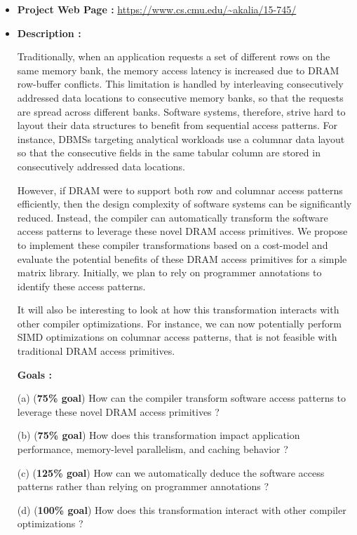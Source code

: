 \documentclass[letterpaper]{article}
\begin{document}
\begin{itemize}

\item \textbf{Project Web Page :} \url{https://www.cs.cmu.edu/~akalia/15-745/}

\item \textbf{Description :} 

Traditionally, when an application requests a set of different rows 
on the same memory bank, the memory access latency is increased due
to DRAM row-buffer conflicts.
This limitation is handled by interleaving consecutively 
addressed data locations to consecutive memory banks, so that
the requests are spread across different banks.
Software systems, therefore, strive hard to layout their data structures 
to benefit from sequential access patterns. 
For instance, DBMSs targeting analytical workloads use a columnar data 
layout so that the consecutive fields in the same tabular column are stored in
consecutively addressed data locations.

However, if DRAM were to support both row and columnar access patterns
efficiently, then the design complexity of software systems can be significantly 
reduced. Instead, the compiler can automatically transform the software access
patterns to leverage these novel DRAM access primitives. 
We propose to implement these compiler transformations based
on a cost-model and evaluate the potential benefits of these DRAM access
primitives for a simple matrix library. Initially, we plan to rely on 
programmer annotations to identify these access patterns.

It will also be interesting to look at how this transformation interacts with
other compiler optimizations. For instance, we can now potentially perform
SIMD optimizations on columnar access patterns, that is not feasible with
traditional DRAM access primitives.

\textbf{Goals :}

(a) (\textbf{75\% goal}) How can the compiler transform software access patterns
to leverage these novel DRAM access primitives ?

(b) (\textbf{75\% goal}) How does this transformation impact application
performance, memory-level parallelism, and caching behavior ? 

(c) (\textbf{125\% goal}) How can we automatically deduce the software access
patterns rather than relying on programmer annotations ?

(d) (\textbf{100\% goal}) How does this transformation interact with other
compiler optimizations ?

\end{itemize}
\end{document}
